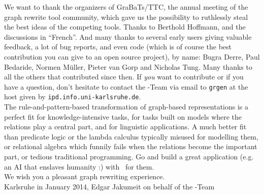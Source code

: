 
We want to thank the organizers of GraBaTs\cite{grabats}/TTC, the annual meeting of the graph rewrite tool community,
which gave us the possibility to ruthlessly steal the best ideas of the competing tools.
Thanks to Berthold Hoffmann, and the discussions in ``French''.
And many thanks to several early users giving valuable feedback, a lot of bug reports, and even code (which is of course the best contribution you can give to an open source project), by name:
Bugra Derre, Paul Bedaride, Normen Müller, Pieter van Gorp and Nicholas Tung.
Many thanks to all the others that contributed since then.
If \emph{you} want to contribute or if you have a question, don't hesitate to contact the \GrG-Team
via email to \texttt{grgen} at the host given by \texttt{ipd.info.uni-karlsruhe.de}.\\[2ex]

The rule-and-pattern-based transformation of graph-based representations is a perfect fit for know\-ledge-intensive tasks, for tasks built on models where the relations play a central part, and for linguistic applications.
A much better fit than predicate logic or the lambda calculus typically misused for modelling them, or relational algebra which funnily fails when the relations become the important part, or tedious traditional programming.
Go and build a great application (e.g. an AI that enslaves humanity :) with \GrG\ for them.\\[2ex]

We wish you a pleasant graph rewriting experience.\\[2ex]

\noindent Karlsruhe in January 2014, Edgar Jakumeit on behalf of the \GrG-Team
